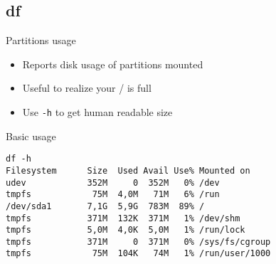\subsection{df}

\begin{frame}[fragile]{Partitions usage}
  \begin{itemize}
    \pause \item Reports disk usage of partitions mounted
    \pause \item Useful to realize your / is full
    \pause \item Use \texttt{-h} to get human readable size
  \end{itemize}
  \pause
  \begin{exampleblock}{Basic usage}
    \begin{lstlisting}[showstringspaces=false]
df -h
Filesystem      Size  Used Avail Use% Mounted on
udev            352M     0  352M   0% /dev
tmpfs            75M  4,0M   71M   6% /run
/dev/sda1       7,1G  5,9G  783M  89% /
tmpfs           371M  132K  371M   1% /dev/shm
tmpfs           5,0M  4,0K  5,0M   1% /run/lock
tmpfs           371M     0  371M   0% /sys/fs/cgroup
tmpfs            75M  104K   74M   1% /run/user/1000
    \end{lstlisting}
  \end{exampleblock}
\end{frame}
